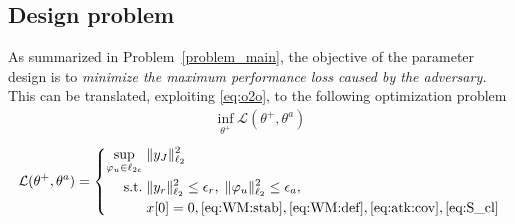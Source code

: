 

\subsection{Design problem}
As summarized in Problem~\ref{problem_main}, the objective of the parameter design is to \textit{minimize the maximum performance loss caused by the adversary.} 
This can be translated, exploiting \eqref{eq:o2o}, to the following optimization problem
\begin{align}\label{eq:o2o:problem}
    \inf_{\theta^+} \mathcal{L}(\theta^+,\theta^a)
\end{align}
\begin{equation}\label{p1}
\mathcal{L}(\theta^+,\theta^a) =
 \left\{    \begin{aligned}
    \sup_{\varphi_u \in\ell_{2e}} & \; \|y_J\|_{\ell_2}^2 \\
		\text{s.t.} &\; \|y_r\|_{\ell_2}^2  \leq \epsilon_r,\; \|\varphi_u\|_{\ell_2}^2 \leq \epsilon_a,\\
                    &\; x[0] = 0, \eqref{eq:WM:stab}, \eqref{eq:WM:def},\eqref{eq:atk:cov},\eqref{eq:S_cl} 
\end{aligned}\right.
\end{equation}

